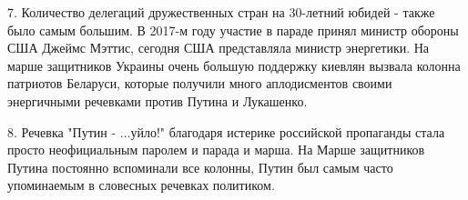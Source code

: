 7. Количество делегаций дружественных стран  на 30-летний юбидей - также было
самым большим. В 2017-м году участие в параде принял министр обороны США Джеймс
Мэттис, сегодня США представляла министр энергетики. На марше защитников
Украины очень большую поддержку киевлян вызвала колонна патриотов Беларуси,
которые получили много аплодисментов своими энергичными речевками против Путина
и Лукашенко.

8. Речевка "Путин - ...уйло!" благодаря истерике российской пропаганды стала
просто неофициальным паролем и парада и марша. На Марше защитников Путина
постоянно вспоминали все колонны, Путин был самым часто упоминаемым в словесных
речевках политиком.
